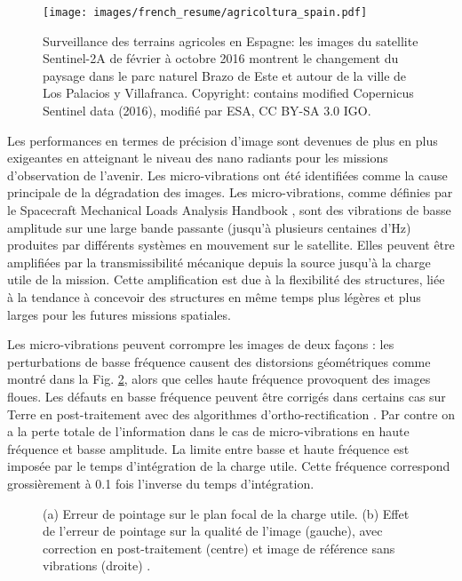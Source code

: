 \begin{figure}[!h]
	\centering
	\texttt{[image: images/french\_resume/agricoltura\_spain.pdf]}
	\caption{Surveillance des terrains agricoles en Espagne: les images du satellite Sentinel-2A de f\'evrier \`a octobre 2016 montrent le changement du paysage dans le parc naturel Brazo de Este et autour de la ville de Los Palacios y Villafranca. Copyright: contains modified Copernicus Sentinel data (2016), modifié par ESA, CC BY-SA 3.0 IGO.}
	\label{fig:agricoltura_spain_fr}
\end{figure}

Les performances en termes de pr\'ecision d'image sont devenues de plus en plus exigeantes en atteignant le niveau des nano radiants pour les missions d'observation de l'avenir. 
Les micro-vibrations ont \'et\'e identifi\'ees comme la cause principale de la d\'egradation des images. Les micro-vibrations, comme d\'efinies par le Spacecraft Mechanical Loads Analysis Handbook \cite{CRS13}, sont des vibrations de basse amplitude sur une large bande passante (jusqu'\`a plusieurs centaines d'Hz) produites par diff\'erents syst\`emes en mouvement sur le satellite. Elles peuvent \^etre amplifi\'ees par la transmissibilit\'e mécanique depuis la source jusqu'\`a la charge utile de la mission. Cette amplification est due \`a la flexibilit\'e des structures, li\'ee \`a la tendance \`a concevoir des structures en m\^eme temps plus l\'eg\`eres et plus larges pour les futures missions spatiales. 

Les micro-vibrations peuvent corrompre les images de deux façons : les perturbations de basse fr\'equence causent des distorsions g\'eom\'etriques comme montr\'e dans la Fig. \ref{fig:distortion_fr}, alors que celles haute fr\'equence provoquent des images floues. Les d\'efauts en basse fr\'equence peuvent être corrig\'es dans certains cas sur Terre en post-traitement avec des algorithmes d'ortho-rectification \cite{LBAA07,MOF15}. Par contre on a la perte totale de l'information dans le cas de micro-vibrations en haute fr\'equence et basse amplitude. La limite entre basse et haute fr\'equence est impos\'ee par le temps d'int\'egration de la charge utile. Cette fr\'equence correspond grossi\`erement \`a 0.1 fois l'inverse du temps d'int\'egration.
   
\begin{figure}[!h]%
    \centering
    \qquad
    \caption{(a) Erreur de pointage sur le plan focal de la charge utile. (b) Effet de l'erreur de pointage sur la qualit\'e de l'image (gauche), avec correction en post-traitement (centre) et image de référence sans vibrations (droite) \cite{CRS13}.}%
    \label{fig:distortion_fr}%
\end{figure}

